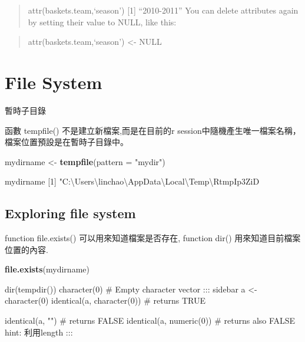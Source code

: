 \documentclass[]{book}
\newenvironment{Shaded}{\begin{snugshade}}{\end{snugshade}}
\newcommand{\DataTypeTok}[1]{\textcolor[rgb]{0.13,0.29,0.53}{#1}}
\newcommand{\KeywordTok}[1]{\textcolor[rgb]{0.13,0.29,0.53}{\textbf{#1}}}
\newcommand{\NormalTok}[1]{#1}
\newcommand{\StringTok}[1]{\textcolor[rgb]{0.31,0.60,0.02}{#1}}
\theoremstyle{definition}
\theoremstyle{definition}
\theoremstyle{definition}
\theoremstyle{remark}
\begin{document}
\begin{quote}
attr(baskets.team,`season') {[}1{]} ``2010-2011'' You can delete
attributes again by setting their value to NULL, like this:
\end{quote}

\begin{quote}
attr(baskets.team,`season') \textless{}- NULL
\end{quote}

\hypertarget{file-system}{%
\chapter{File System}\label{file-system}}

暫時子目錄

函數 tempfile() 不是建立新檔案,而是在目前的r
session中隨機產生唯一檔案名稱，檔案位置預設是在暫時子目錄中。

\begin{Shaded}
\begin{Highlighting}[]
\NormalTok{mydirname <-}\StringTok{ }\KeywordTok{tempfile}\NormalTok{(}\DataTypeTok{pattern =} \StringTok{"mydir"}\NormalTok{)}
\end{Highlighting}
\end{Shaded}

mydirname {[}1{]}
"C:\textbackslash{}Users\textbackslash{}linchao\textbackslash{}AppData\textbackslash{}Local\textbackslash{}Temp\textbackslash{}RtmpIp3ZiD\\

\hypertarget{exploring-file-system}{%
\section{Exploring file system}\label{exploring-file-system}}

function file.exists() 可以用來知道檔案是否存在, function dir()
用來知道目前檔案位置的內容.

\begin{Shaded}
\begin{Highlighting}[]
\KeywordTok{file.exists}\NormalTok{(mydirname)}
\end{Highlighting}
\end{Shaded}

dir(tempdir()) character(0) \# Empty character vector ::: sidebar a
\textless{}- character(0) identical(a, character(0)) \# returns TRUE

identical(a, "") \# returns FALSE identical(a, numeric(0)) \# returns
also FALSE hint: 利用length :::
\end{document}

